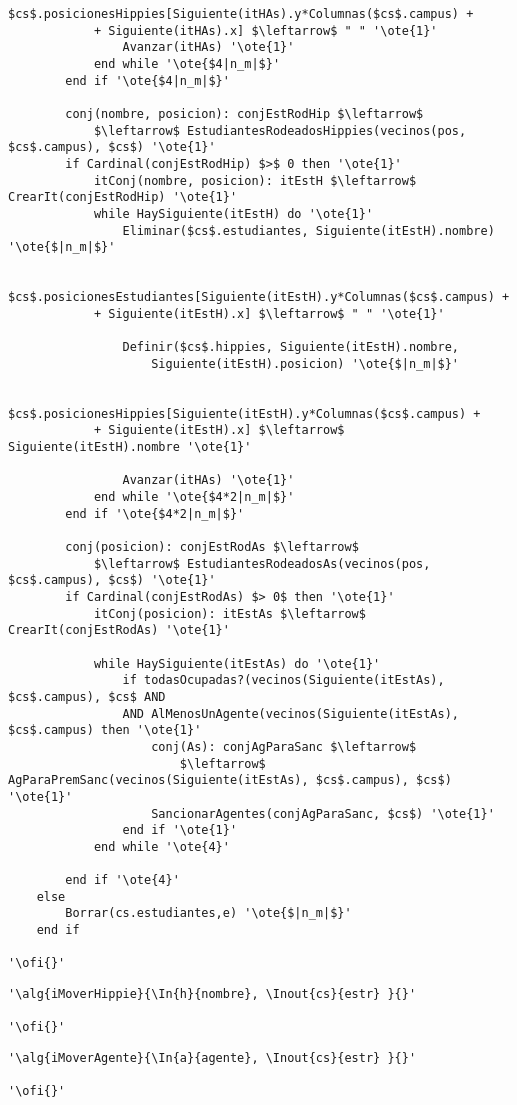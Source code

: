 \begin{lstlisting}[mathescape]
				$cs$.posicionesHippies[Siguiente(itHAs).y*Columnas($cs$.campus) +
			+ Siguiente(itHAs).x] $\leftarrow$ " " '\ote{1}'
				Avanzar(itHAs) '\ote{1}'
			end while '\ote{$4|n_m|$}'
		end if '\ote{$4|n_m|$}'

		conj(nombre, posicion): conjEstRodHip $\leftarrow$
			$\leftarrow$ EstudiantesRodeadosHippies(vecinos(pos, $cs$.campus), $cs$) '\ote{1}'
		if Cardinal(conjEstRodHip) $>$ 0 then '\ote{1}'
			itConj(nombre, posicion): itEstH $\leftarrow$ CrearIt(conjEstRodHip) '\ote{1}'	
			while HaySiguiente(itEstH) do '\ote{1}'
				Eliminar($cs$.estudiantes, Siguiente(itEstH).nombre) '\ote{$|n_m|$}'
				
				$cs$.posicionesEstudiantes[Siguiente(itEstH).y*Columnas($cs$.campus) +
			+ Siguiente(itEstH).x] $\leftarrow$ " " '\ote{1}'

				Definir($cs$.hippies, Siguiente(itEstH).nombre, 
					Siguiente(itEstH).posicion) '\ote{$|n_m|$}'
				
				$cs$.posicionesHippies[Siguiente(itEstH).y*Columnas($cs$.campus) +
			+ Siguiente(itEstH).x] $\leftarrow$ Siguiente(itEstH).nombre '\ote{1}'
			
				Avanzar(itHAs) '\ote{1}'
			end while '\ote{$4*2|n_m|$}'
		end if '\ote{$4*2|n_m|$}'

		conj(posicion): conjEstRodAs $\leftarrow$
			$\leftarrow$ EstudiantesRodeadosAs(vecinos(pos, $cs$.campus), $cs$) '\ote{1}'
		if Cardinal(conjEstRodAs) $> 0$ then '\ote{1}'
			itConj(posicion): itEstAs $\leftarrow$ CrearIt(conjEstRodAs) '\ote{1}'
			
			while HaySiguiente(itEstAs) do '\ote{1}'
				if todasOcupadas?(vecinos(Siguiente(itEstAs), $cs$.campus), $cs$ AND 
				AND AlMenosUnAgente(vecinos(Siguiente(itEstAs), $cs$.campus) then '\ote{1}'
					conj(As): conjAgParaSanc $\leftarrow$ 
						$\leftarrow$ AgParaPremSanc(vecinos(Siguiente(itEstAs), $cs$.campus), $cs$) '\ote{1}'
					SancionarAgentes(conjAgParaSanc, $cs$) '\ote{1}'
				end if '\ote{1}'
			end while '\ote{4}'

		end if '\ote{4}'
	else
		Borrar(cs.estudiantes,e) '\ote{$|n_m|$}'
	end if

'\ofi{}'
\end{lstlisting}

\begin{lstlisting}[mathescape]
'\alg{iMoverHippie}{\In{h}{nombre}, \Inout{cs}{estr} }{}'
	
'\ofi{}'
\end{lstlisting}

\begin{lstlisting}[mathescape]
'\alg{iMoverAgente}{\In{a}{agente}, \Inout{cs}{estr} }{}'

'\ofi{}'
\end{lstlisting}

